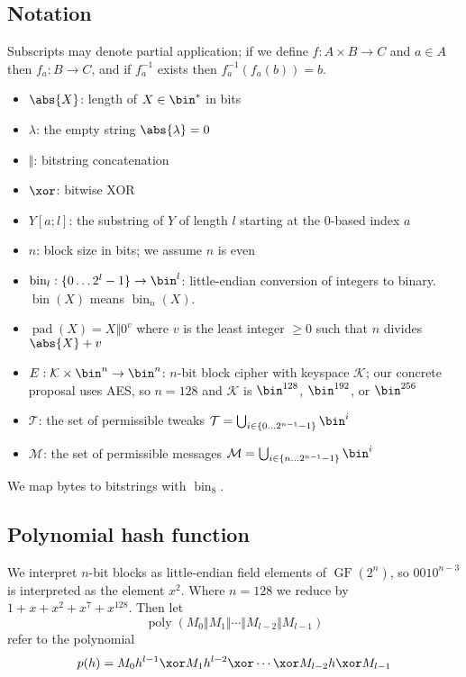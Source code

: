 \documentclass[letterpaper,11pt]{article}
\newcommand*{\Concat}{\Vert}
\DeclareMathOperator{\fromint}{bin}
\DeclareMathOperator{\GF}{GF}
\DeclareMathOperator{\pad}{pad}
\DeclareMathOperator{\poly}{poly}
\begin{document}
\subsection{Notation}
Subscripts may denote partial application; if we define $f: A \times B \rightarrow C$ and
$a \in A$ then $f_a: B \rightarrow C$, and if $f_a^{-1}$ exists then $f_a^{-1}(f_a(b)) = b$.
\begin{itemize}
    \item $\abs{X}$: length of $X \in \bin^{*}$ in bits
    \item $\lambda$: the empty string $\abs{\lambda} = 0$
    \item $\Concat$: bitstring concatenation
    \item \(\xor\): bitwise XOR
    \item $Y[a;l]$: the substring of $Y$ of length $l$ starting at the 0-based index $a$
    \item \(n\): block size in bits; we assume \(n\) is even
    \item $\fromint_l: \{0 \ldots 2^l-1\} \rightarrow \bin^l$:
    little-endian conversion of integers to binary. 
    \(\fromint(X)\) means \(\fromint_n(X)\).
    \item $\pad(X) = X \Concat 0^v$
    where $v$ is the least integer $\geq 0$ such that $n$ divides $\abs{X} + v$
    \item \(E: \mathcal{K} \times \bin^n \rightarrow \bin^n\): 
    \(n\)-bit block cipher with keyspace \(\mathcal{K}\);
    our concrete proposal uses AES, so \(n=128\) and \(\mathcal{K}\) is
    \(\bin^{128}\), \(\bin^{192}\), or \(\bin^{256}\)
    \item \(\mathcal{T}\): the set of permissible tweaks
    \(\mathcal{T} = \bigcup_{i \in \{0\ldots2^{n-1}-1\}}\bin^i\)
    \item \(\mathcal{M}\): the set of permissible messages
    \(\mathcal{M} = \bigcup_{i \in \{n\ldots2^{n-1}-1\}}\bin^i\)
\end{itemize}
We map bytes to bitstrings with \(\fromint_8\).

\subsection{Polynomial hash function}
We interpret \(n\)-bit blocks as little-endian field elements of \(\GF(2^n)\),
so \(0010^{n-3}\) is interpreted as the element \(x^2\).
Where \(n=128\) we reduce by
\(1 + x + x^2 + x^7 + x^{128}\). Then let
\begin{displaymath}
    \poly(M_0 \Concat M_1 \Concat \cdots \Concat M_{l-2} \Concat M_{l-1})
\end{displaymath}
refer to the polynomial
\begin{displaymath}
    p(h) = M_0h^{l-1} \xor M_1h^{l-2} \xor \cdots \xor M_{l-2}h \xor M_{l-1}
\end{displaymath}
\end{document}
